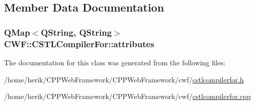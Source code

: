 \subsection{Member Data Documentation}
\hypertarget{class_c_w_f_1_1_c_s_t_l_compiler_for_ab90c925cb83704f2e22f19cdf9d48974}{
\subsubsection[{attributes}]{\setlength{\rightskip}{0pt plus 5cm}Q\+Map$<$Q\+String, Q\+String$>$ C\+W\+F\+::\+C\+S\+T\+L\+Compiler\+For\+::attributes}}\label{class_c_w_f_1_1_c_s_t_l_compiler_for_ab90c925cb83704f2e22f19cdf9d48974}


The documentation for this class was generated from the following files\+:\begin{DoxyCompactItemize}
\item 
/home/herik/\+C\+P\+P\+Web\+Framework/\+C\+P\+P\+Web\+Framework/cwf/\hyperlink{cstlcompilerfor_8h}{cstlcompilerfor.\+h}\item 
/home/herik/\+C\+P\+P\+Web\+Framework/\+C\+P\+P\+Web\+Framework/cwf/\hyperlink{cstlcompilerfor_8cpp}{cstlcompilerfor.\+cpp}\end{DoxyCompactItemize}
